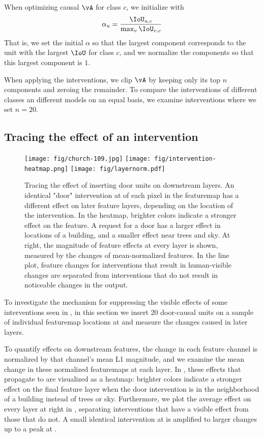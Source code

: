 \documentclass{article} %
\begin{document}
  When optimizing causal $\vA$ for class $c$, we initialize with
\begin{align}
\alpha_u = \frac{\IoU_{u,c}}{\max_v \IoU_{v,c}}
\end{align}
That is, we set the initial $\alpha$ so that the largest component corresponds to the unit with the largest $\IoU$ for class $c$, and we normalize the components so that this largest component is $1$.

  When applying the interventions, we clip $\vA$ by keeping only its top $n$ components and zeroing the remainder.  To compare the interventions of different classes an different models on an equal basis, we examine interventions where we set $n=20$.

\subsection{Tracing the effect of an intervention}\begin{figure}
\centering
\texttt{[image: fig/church-109.jpg]}
\texttt{[image: fig/intervention-heatmap.png]}%
\texttt{[image: fig/layernorm.pdf]}%
\caption{Tracing the effect of inserting door units on downstream layers. An identical "door" intervention at  of each pixel in the featuremap has a different effect on later feature layers, depending on the location of the intervention.  In the heatmap, brighter colors indicate a stronger effect on the  feature.  A request for a door has a larger effect in locations of a building, and a smaller effect near trees and sky.  At right, the magnitude of feature effects at every layer is shown, measured by the changes of mean-normalized features.  In the line plot, feature changes for interventions that result in human-visible changes are separated from interventions that do not result in noticeable changes in the output.
}
\vspace{-10pt}
\end{figure}
To investigate the mechanism for suppressing the visible effects of some interventions seen in , in this section we insert 20 door-causal units on a sample of individual featuremap locations at  and measure the changes caused in later layers. %

To quantify effects on downstream features, the change in each feature channel is normalized by that channel's mean L1 magnitude, and we examine the mean change in these normalized featuremaps at each layer.  In , these effects that propagate to  are visualized as a heatmap: brighter colors indicate a stronger effect on the final feature layer when the door intervention is in the neighborhood of a building instead of trees or sky.  Furthermore, we plot the average effect on every layer at right in  , separating interventions that have a visible effect from those that do not.  A small identical intervention at  is amplified to larger changes up to a peak at .
\end{document}
